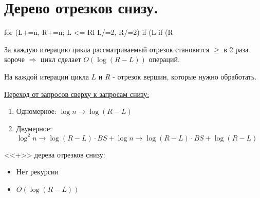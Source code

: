 \section{Дерево отрезков снизу.}

\begin{cppcode}
for (L+=n, R+=n; L <= Rl L/=2, R/=2)
{
	if (L%
	if (R%
}
\end{cppcode}

За каждую итерацию цикла рассматриваемый отрезок становится $\ge$ в 2 раза короче $\Rightarrow$ цикл сделает $O(\log(R - L))$ операций.

На каждой итерации цикла $L$ и $R$ - отрезок вершин, которые нужно обработать.

\underline{Переход от запросов сверху к запросам снизу:}
\begin{enumerate}
	\item Одномерное: $\log n \rightarrow \log(R - L)$
	\item Двумерное: $\log^2n \rightarrow \log(R - L)\cdot BS + \log n \rightarrow \log(R - L)\cdot BS + \log(R - L)$
\end{enumerate}

<<+>> дерева отрезков снизу:
\begin{itemize}
	\item Нет рекурсии
	\item $O(\log(R - L))$
\end{itemize} 

